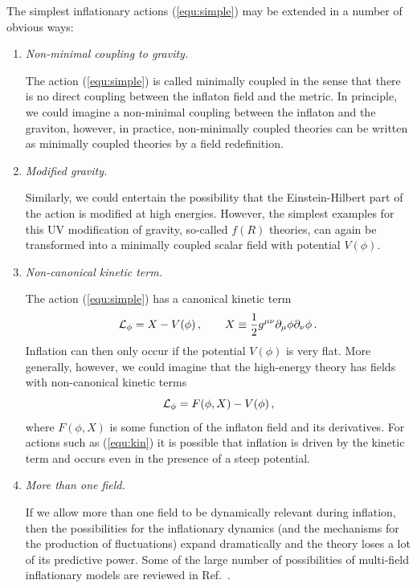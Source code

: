 \documentclass[12pt,letterpaper,rotate]{article}
\def\beq{\begin{equation}}
\def\eeq{\end{equation}}
\begin{document}
{The simplest inflationary actions (\ref{equ:simple}) may be extended in a number of obvious ways:

\begin{enumerate}
\item {\it Non-minimal coupling to gravity.}

The action (\ref{equ:simple}) is called minimally coupled in the sense that there is no direct coupling between the inflaton field and the metric. In principle, we could imagine a non-minimal coupling between the inflaton and the graviton, however, in practice, non-minimally coupled theories can be written as minimally coupled theories by a field redefinition.

\item {\it Modified gravity.}

Similarly, we could entertain the possibility that the Einstein-Hilbert part of the action is modified at high energies. However, the simplest examples for this UV modification of gravity, so-called $f(R)$ theories, can again be transformed into a minimally coupled scalar field with potential $V(\phi)$.

\item {\it Non-canonical kinetic term.}

The action (\ref{equ:simple}) has a canonical kinetic term 
\beq
{\cal L}_\phi = X - V(\phi)\, , \qquad X \equiv \frac{1}{2} g^{\mu \nu} \partial_\mu \phi \partial_\nu \phi\, .
\eeq
Inflation can then only occur if the potential $V(\phi)$ is very flat.
More generally, however, we could imagine that the high-energy theory has fields with non-canonical kinetic terms
\beq
\label{equ:kin}
{\cal L}_\phi = F(\phi, X) - V(\phi)\, , 
\eeq
where $F(\phi,X)$ is some function of the inflaton field and its derivatives.
For actions such as (\ref{equ:kin}) it is possible that inflation is driven by the kinetic term and occurs even in the presence of a steep potential.

\item {\it More than one field.}

If we allow more than one field to be dynamically relevant during inflation, then the possibilities for the inflationary dynamics (and the mechanisms for the production of fluctuations) expand dramatically and the theory loses a lot of its predictive power.
Some of the large number of possibilities of multi-field inflationary models are reviewed in Ref.~\cite{WandsMulti}.
\end{enumerate}




}
\end{document}
